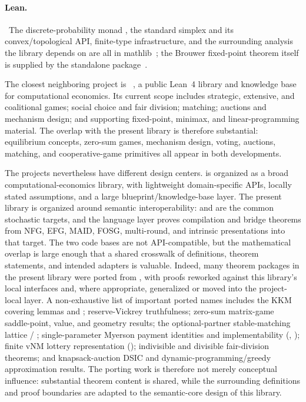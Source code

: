 \paragraph{Lean.}\ The discrete-probability monad , the
standard simplex and its convex/topological API, finite-type
infrastructure, and the surrounding analysis the library depends
on are all in mathlib~\citep{mathlib2020}; the Brouwer fixed-point
theorem itself is supplied by the standalone
package~\citep{harfeFixedPointTheorems}.

The closest neighboring project is
~\citep{EconCSLib2026}, a public Lean~4 library and
knowledge base for computational economics.  Its current scope
includes strategic, extensive, and coalitional games; social choice
and fair division; matching; auctions and mechanism design; and
supporting fixed-point, minimax, and linear-programming material.
The overlap with the present library is therefore substantial:
equilibrium concepts, zero-sum games, mechanism design, voting,
auctions, matching, and cooperative-game primitives all appear in
both developments.

The projects nevertheless have different design centers.
 is organized as a broad computational-economics
library, with lightweight domain-specific APIs, locally stated
assumptions, and a large blueprint/knowledge-base layer.  The
present library is organized around semantic interoperability:
 and  are the common stochastic targets,
and the language layer proves compilation and bridge theorems from
NFG, EFG, MAID, FOSG, multi-round, and intrinsic presentations into
that target.  The two code bases are not API-compatible, but the
mathematical overlap is large enough that a shared crosswalk of
definitions, theorem statements, and intended adapters is valuable.
Indeed, many theorem packages in the present library were ported from
, with proofs reworked against this library's local
interfaces and, where appropriate, generalized or moved into the
project-local  layer.  A non-exhaustive list of important
ported names includes the KKM covering lemmas
 and ; reserve-Vickrey
truthfulness; zero-sum matrix-game saddle-point, value, and geometry
results; the optional-partner stable-matching lattice
 / ; single-parameter
Myerson payment identities and implementability
(,
); finite
vNM lottery representation
(); indivisible
and divisible fair-division theorems; and knapsack-auction DSIC and
dynamic-programming/greedy approximation results.  The porting work is
therefore not merely conceptual influence: substantial theorem content
is shared, while the surrounding definitions and proof boundaries are
adapted to the semantic-core design of this library.

